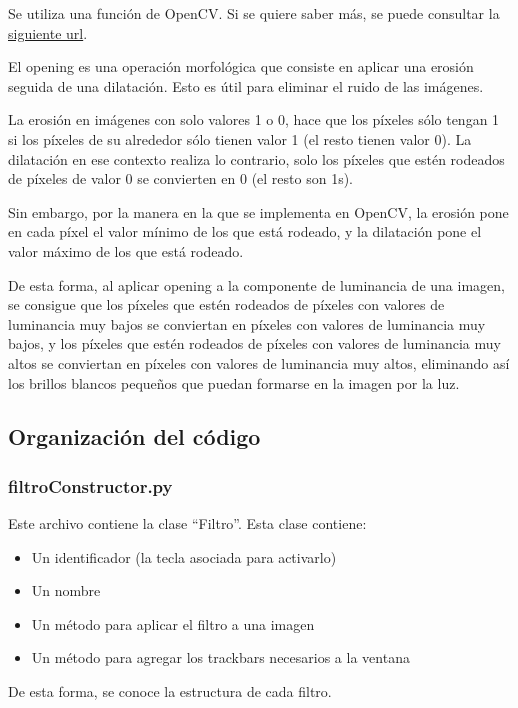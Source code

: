 \documentclass[12pt]{article}
\begin{document}
Se utiliza una función de OpenCV. Si se quiere saber más, se puede consultar la \href{https://docs.opencv.org/4.x/d9/d61/tutorial_py_morphological_ops.html#gsc.tab=0}{siguiente url}.

El opening es una operación morfológica que consiste en aplicar una erosión seguida de una dilatación. Esto es útil para eliminar el ruido de las imágenes.

La erosión en imágenes con solo valores 1 o 0, hace que los píxeles sólo tengan 1 si los píxeles de su alrededor sólo tienen valor 1 (el resto tienen valor 0). La dilatación en ese contexto realiza lo contrario, solo los píxeles que estén rodeados de píxeles de valor 0 se convierten en 0 (el resto son 1s).

Sin embargo, por la manera en la que se implementa en OpenCV, la erosión pone en cada píxel el valor mínimo de los que está rodeado, y la dilatación pone el valor máximo de los que está rodeado.

De esta forma, al aplicar opening a la componente de luminancia de una imagen, se consigue que los píxeles que estén rodeados de píxeles con valores de luminancia muy bajos se conviertan en píxeles con valores de luminancia muy bajos, y los píxeles que estén rodeados de píxeles con valores de luminancia muy altos se conviertan en píxeles con valores de luminancia muy altos, eliminando así los brillos blancos pequeños que puedan formarse en la imagen por la luz.

\subsection*{Organización del código}

\subsubsection*{filtroConstructor.py}
Este archivo contiene la clase ``Filtro''.  Esta clase contiene:
\begin{itemize}
    \item Un identificador (la tecla asociada para activarlo)
    \item Un nombre
    \item Un método para aplicar el filtro a una imagen
    \item Un método para agregar los trackbars necesarios a la ventana
\end{itemize}

De esta forma, se conoce la estructura de cada filtro. 
\end{document}
